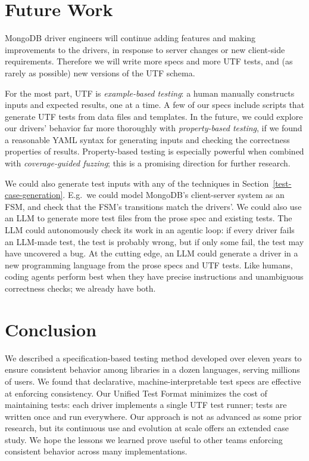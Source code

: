 \documentclass[conference]{IEEEtran}
\begin{document}
\section{Future Work}

MongoDB driver engineers will continue adding features and making improvements to the drivers, in response to server changes or new client-side requirements. Therefore we will write more specs and more UTF tests, and (as rarely as possible) new versions of the UTF schema.

For the most part, UTF is \textit{example-based testing}: a human manually constructs inputs and expected results, one at a time. A few of our specs include scripts that generate UTF tests from data files and templates. In the future, we could explore our drivers' behavior far more thoroughly with \textit{property-based testing}, if we found a reasonable YAML syntax for generating inputs and checking the correctness properties of results. Property-based testing is especially powerful when combined with \textit{coverage-guided fuzzing}; this is a promising direction for further research.

We could also generate test inputs with any of the techniques in Section~\ref{test-case-generation}. E.g.\ we could model MongoDB's client-server system as an FSM, and check that the FSM's transitions match the drivers'. We could also use an LLM to generate more test files from the prose spec and existing tests. The LLM could autonomously check its work in an agentic loop: if every driver fails an LLM-made test, the test is probably wrong, but if only some fail, the test may have uncovered a bug. At the cutting edge, an LLM could generate a driver in a new programming language from the prose specs and UTF tests. Like humans, coding agents perform best when they have precise instructions and unambiguous correctness checks; we already have both.

\section{Conclusion}

We described a specification-based testing method developed over eleven years to ensure consistent behavior among libraries in a dozen languages, serving millions of users. We found that declarative, machine-interpretable test specs are effective at enforcing consistency. Our Unified Test Format minimizes the cost of maintaining tests: each driver implements a single UTF test runner; tests are written once and run everywhere. Our approach is not as advanced as some prior research, but its continuous use and evolution at scale offers an extended case study. We hope the lessons we learned prove useful to other teams enforcing consistent behavior across many implementations.



\end{document}

